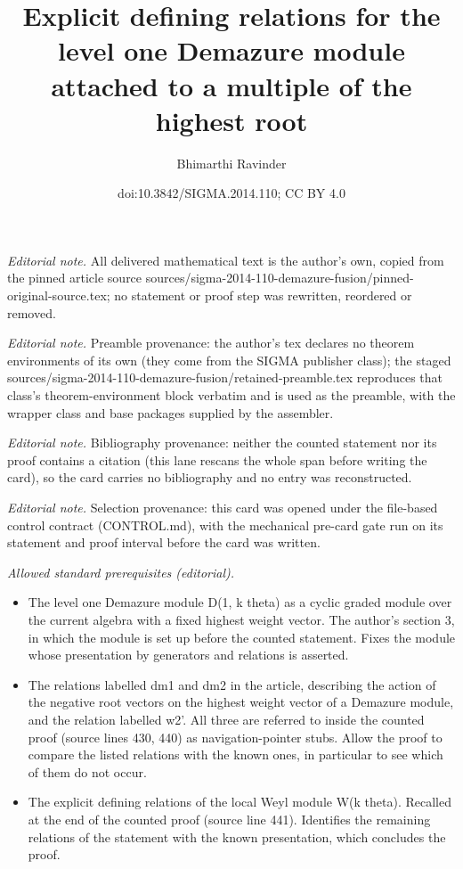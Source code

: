 \documentclass[10pt,a4paper]{amsart}
\title{Explicit defining relations for the level one Demazure module attached to a multiple of the highest root}
\author{Bhimarthi Ravinder}
\date{doi:10.3842/SIGMA.2014.110; CC BY 4.0}
\begin{document}
\maketitle
\noindent\textit{Editorial note.} All delivered mathematical text is the author's own, copied from the pinned article source sources/sigma-2014-110-demazure-fusion/pinned-original-source.tex; no statement or proof step was rewritten, reordered or removed.\par\medskip
\noindent\textit{Editorial note.} Preamble provenance: the author's tex declares no theorem environments of its own (they come from the SIGMA publisher class); the staged sources/sigma-2014-110-demazure-fusion/retained-preamble.tex reproduces that class's theorem-environment block verbatim and is used as the preamble, with the wrapper class and base packages supplied by the assembler.\par\medskip
\noindent\textit{Editorial note.} Bibliography provenance: neither the counted statement nor its proof contains a citation (this lane rescans the whole span before writing the card), so the card carries no bibliography and no entry was reconstructed.\par\medskip
\noindent\textit{Editorial note.} Selection provenance: this card was opened under the file-based control contract (CONTROL.md), with the mechanical pre-card gate run on its statement and proof interval before the card was written.\par\medskip
\noindent\textit{Allowed standard prerequisites (editorial).}\begin{itemize}
\item The level one Demazure module D(1, k theta) as a cyclic graded module over the current algebra with a fixed highest weight vector. The author's section 3, in which the module is set up before the counted statement. Fixes the module whose presentation by generators and relations is asserted.
\item The relations labelled dm1 and dm2 in the article, describing the action of the negative root vectors on the highest weight vector of a Demazure module, and the relation labelled w2'. All three are referred to inside the counted proof (source lines 430, 440) as navigation-pointer stubs. Allow the proof to compare the listed relations with the known ones, in particular to see which of them do not occur.
\item The explicit defining relations of the local Weyl module W(k theta). Recalled at the end of the counted proof (source line 441). Identifies the remaining relations of the statement with the known presentation, which concludes the proof.
\end{itemize}\medskip
\end{document}
